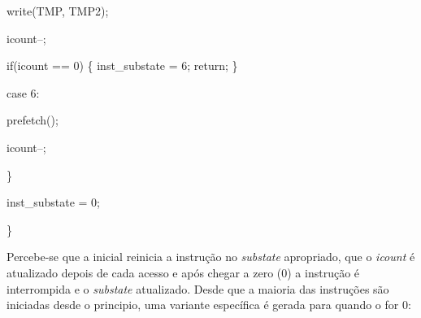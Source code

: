 \documentclass[letterpaper,10pt,brazil]{sphinxmanual}
\begin{document}
\begin{DUlineblock}{0em}
\item[]
\begin{DUlineblock}{\DUlineblockindent}
\item[] write(TMP, TMP2);
\item[] icount--;
\item[] if(icount == 0) \{ inst\_substate = 6; return; \}
\end{DUlineblock}
\item[] case 6:
\item[]
\begin{DUlineblock}{\DUlineblockindent}
\item[] prefetch();
\item[] icount--;
\end{DUlineblock}
\item[] \}
\item[]
\begin{DUlineblock}{\DUlineblockindent}
\item[] inst\_substate = 0;
\end{DUlineblock}
\item[] \}
\item[] 
\end{DUlineblock}

Percebe-se que a inicial  reinicia a instrução no \emph{substate}
apropriado, que o \emph{icount} é atualizado depois de cada acesso e após
chegar a zero (0) a instrução é interrompida e o \emph{substate} atualizado.
Desde que a maioria das instruções são iniciadas desde o principio, uma
variante específica é gerada para quando o  for 0:
\end{document}
